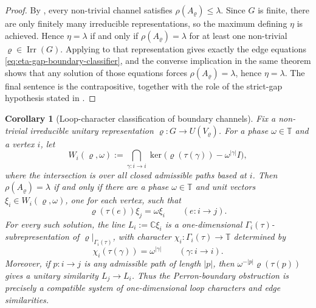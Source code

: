 \documentclass[11pt,a4paper]{amsart}
\theoremstyle{plain}
\newtheorem{corollary}[theorem]{Corollary}
\theoremstyle{definition}
\theoremstyle{remark}
\DeclareMathOperator{\Irr}{Irr}
\newcommand{\CC}{\mathbb{C}}
\newcommand{\TT}{\mathbb{T}}
\begin{document}
\begin{proof}
  By , every non-trivial channel
  satisfies \(\rho(A_\varrho)\le\lambda\). Since \(G\) is finite, there
  are only finitely many irreducible representations, so the maximum
  defining \(\eta\) is achieved. Hence \(\eta=\lambda\) if and only if
  \(\rho(A_\varrho)=\lambda\) for at least one non-trivial
  \(\varrho\in\Irr(G)\). Applying  to that
  representation gives exactly the edge equations
  \eqref{eq:eta-gap-boundary-classifier}, and the converse implication in
  the same theorem shows that any solution of those equations forces
  \(\rho(A_\varrho)=\lambda\), hence \(\eta=\lambda\). The final sentence
  is the contrapositive, together with the role of the strict-gap
  hypothesis stated in .
\end{proof}

\begin{corollary}[Loop-character classification of boundary channels]
  \label{cor:eta-gap-character-classification}
  Fix a non-trivial irreducible unitary representation
  \(\varrho:G\to U(V_\varrho)\). For a phase \(\omega\in\TT\) and a vertex
  \(i\), let
  \[
    W_i(\varrho,\omega)
    :=
    \bigcap_{\gamma:i\to i}
    \ker\bigl(\varrho(\tau(\gamma))-\omega^{|\gamma|}I\bigr),
  \]
  where the intersection is over all closed admissible paths based at
  \(i\). Then \(\rho(A_\varrho)=\lambda\) if and only if there are a phase
  \(\omega\in\TT\) and unit vectors
  \(\xi_i\in W_i(\varrho,\omega)\), one for each vertex, such that
  \[
    \varrho(\tau(e))\xi_j=\omega\xi_i
    \qquad(e:i\to j).
  \]
  For every such solution, the line
  \(L_i:=\CC\xi_i\) is a one-dimensional
  \(\Gamma_i(\tau)\)-subrepresentation of
  \(\varrho|_{\Gamma_i(\tau)}\), with character
  \(\chi_i:\Gamma_i(\tau)\to\TT\) determined by
  \[
    \chi_i(\tau(\gamma))=\omega^{|\gamma|}
    \qquad(\gamma:i\to i).
  \]
  Moreover, if \(p:i\to j\) is any admissible path of length \(|p|\), then
  \(\omega^{-|p|}\varrho(\tau(p))\) gives a unitary similarity
  \(L_j\to L_i\). Thus the Perron-boundary obstruction is precisely a
  compatible system of one-dimensional loop characters and edge
  similarities.
\end{corollary}
\end{document}
